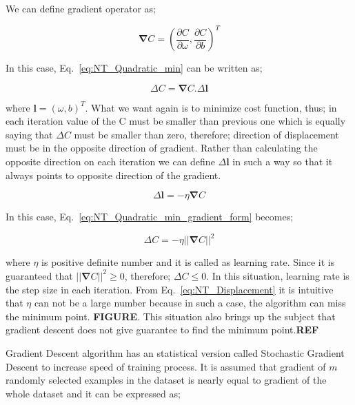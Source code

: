 \documentclass[a4paper,times,12pt]{article}
\begin{document}
We can define gradient operator as;

\begin{equation}
\label{eq:gradient}
\boldsymbol{\nabla}{C} = \left(\frac{\partial{C}}{\partial{\omega}},\frac{\partial{C}}{\partial{b}} \right)^T
\end{equation}

\noindent In this case, Eq.~\ref{eq:NT_Quadratic_min} can be written as;

\begin{equation}
\label{eq:NT_Quadratic_min_gradient_form}
\Delta{C} = \boldsymbol{\nabla}{C} \boldsymbol{.} \Delta \boldsymbol{l}
\end{equation}

\noindent where $\boldsymbol{l} = (\omega, b)^T$. What we want again is to minimize cost function, thus; in each iteration value of the C must be smaller than previous one which is equally saying that $\Delta{C}$ must be smaller than zero, therefore; direction of displacement must be in the opposite direction of gradient. Rather than calculating the opposite direction on each iteration we can define $\Delta{\boldsymbol{l}}$ in such a way so that it always points to opposite direction of the gradient.

\begin{equation}
\label{eq:NT_learning_rate}
\Delta{\boldsymbol{l}} = -\eta\boldsymbol{\nabla}C
\end{equation}

\noindent In this case, Eq.~\ref{eq:NT_Quadratic_min_gradient_form} becomes;

\begin{equation}
\label{eq:NT_Displacement}
\Delta{C} = -\eta ||\boldsymbol{\nabla}{C}||^2
\end{equation}

\noindent where $\eta$ is positive definite number and it is called as learning rate. Since it is guaranteed that $||\boldsymbol{\nabla}{C}||^2 \geq 0$, therefore; $\Delta{C} \leq 0$. In this situation, learning rate is the step size in each iteration. From Eq.~\ref{eq:NT_Displacement} it is intuitive that $\eta$ can not be a large number because in such a case, the algorithm can miss the minimum point. \textbf{FIGURE}. This situation also brings up the subject that gradient descent does not give guarantee to find the minimum point.{\textbf{REF}} 

Gradient Descent algorithm has an statistical version called Stochastic Gradient Descent to increase speed of training process. It is assumed that gradient of  $m$ randomly selected examples in the dataset is nearly equal to gradient of the whole dataset and it can be expressed as;
\end{document}
